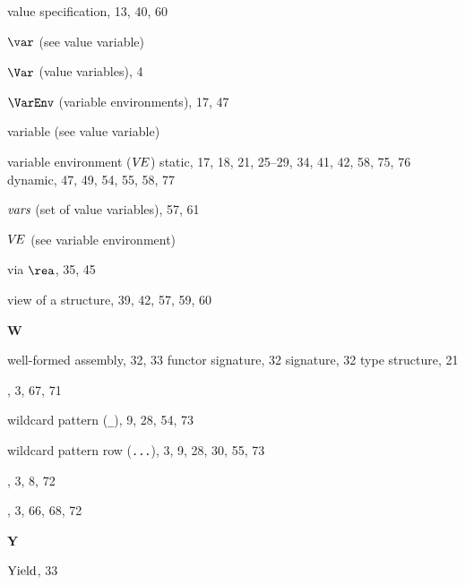 \begin{theindex}
\item value specification, 13, 40, 60
\item $\var$ (see value variable) 
\item $\Var$ (value variables), 4
\item $\VarEnv$ (variable environments), 17, 47
\item variable (see value variable) 
\item variable environment ($\mbox{$V\!E$}$) 
\subitem static, 17, 18, 21, 25--29, 34, 41, 42, 58, 75, 76
\subitem dynamic, 47, 49, 54, 55, 58, 77
\item $\mbox{\it vars}$ (set of value variables), 57, 61
\item $\mbox{$V\!E$}$ (see variable environment) 
\item via $\rea$, 35, 45
\item view of a structure, 39, 42, 57, 59, 60
\indexspace
\parbox{65mm}{\hfil{\large\bf W}\hfil}
\indexspace
\item well-formed 
\subitem assembly, 32, 33
\subitem functor signature, 32
\subitem signature, 32
\subitem type structure, 21
\item \WHILE, 3, 67, 71
\item wildcard pattern (\verb+_+), 9, 28, 54, 73
\item wildcard pattern row (\verb+...+), 3, 9, 28, 30, 55, 73
\item \WITH, 3, 8, 72
\item \WITHTYPE, 3, 66, 68, 72
\indexspace
\parbox{65mm}{\hfil{\large\bf Y}\hfil}
\indexspace
\item $\mathop{\rm Yield}\nolimits$, 33
\end{theindex}
